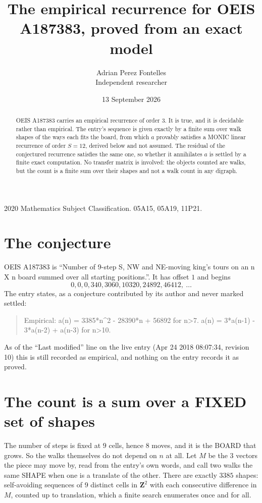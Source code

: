 \documentclass[11pt,a4paper]{article}
\title{The empirical recurrence for OEIS A187383, proved from an exact model}
\author{Adrian Perez Fontelles\\ \small Independent researcher}
\date{13 September 2026}
\theoremstyle{plain}
\theoremstyle{definition}
\begin{document}
\maketitle

\begin{abstract}
OEIS A187383 carries an empirical recurrence of order $3$. It is true, and it is
decidable rather than empirical. The entry's sequence is given exactly by a finite sum over walk shapes of the ways each fits the board, from
which $a$ provably satisfies a MONIC linear recurrence of order $S=12$, derived below and not
assumed. The residual of the conjectured recurrence satisfies the same one, so whether it
annihilates $a$ is settled by a finite exact computation. No transfer matrix is involved: the objects counted are walks, but the count is a finite sum over their shapes and not a walk count in any digraph.
\end{abstract}

\noindent\small 2020 Mathematics Subject Classification. 05A15, 05A19, 11P21.\normalsize

\section{The conjecture}

OEIS A187383 is ``Number of 9-step S, NW and NE-moving king's tours on an n X n board summed over all starting positions.''. It has offset $1$ and begins
\[
0, 0, 0, 340, 3060, 10320, 24892, 46412,\ \dots
\]
The entry states, as a conjecture contributed by its author and never marked settled:
\begin{quote}
Empirical: a(n) = 3385*n\^{}2 - 28390*n + 56892 for n>7. a(n) = 3*a(n-1) - 3*a(n-2) + a(n-3) for n>10.
\end{quote}
As of the ``Last modified'' line on the live entry (Apr 24 2018 08:07:34, revision 10)
this is still recorded as empirical, and nothing on the entry records it as proved.

\section{The count is a sum over a FIXED set of shapes}

The number of steps is fixed at $9$ cells, hence $8$ moves, and it is the BOARD
that grows. So the walks themselves do not depend on $n$ at all. Let $M$ be the $3$
vectors the piece may move by, read from the entry's own words, and call two walks the same
SHAPE when one is a translate of the other. There are exactly $3385$ shapes: self-avoiding
sequences of $9$ distinct cells in $\mathbf{Z}^{2}$ with each consecutive difference in
$M$, counted up to translation, which a finite search enumerates once and for all.
\end{document}
